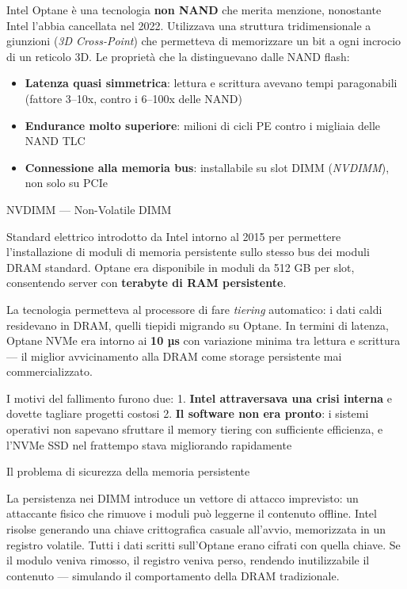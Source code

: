 \documentclass[
  italian,
  openany]{book}
\providecommand{\tightlist}{%
  \setlength{\itemsep}{0pt}\setlength{\parskip}{0pt}}
\begin{document}
Intel Optane è una tecnologia \textbf{non NAND} che merita menzione,
nonostante Intel l'abbia cancellata nel 2022. Utilizzava una struttura
tridimensionale a giunzioni (\emph{3D Cross-Point}) che permetteva di
memorizzare un bit a ogni incrocio di un reticolo 3D. Le proprietà che
la distinguevano dalle NAND flash:

\begin{itemize}
\tightlist
\item
  \textbf{Latenza quasi simmetrica}: lettura e scrittura avevano tempi
  paragonabili (fattore 3--10x, contro i 6--100x delle NAND)
\item
  \textbf{Endurance molto superiore}: milioni di cicli PE contro i
  migliaia delle NAND TLC
\item
  \textbf{Connessione alla memoria bus}: installabile su slot DIMM
  (\emph{NVDIMM}), non solo su PCIe
\end{itemize}

\begin{calloutdefinition}{NVDIMM — Non-Volatile DIMM}

Standard elettrico introdotto da Intel intorno al 2015 per permettere
l'installazione di moduli di memoria persistente sullo stesso bus dei
moduli DRAM standard. Optane era disponibile in moduli da 512 GB per
slot, consentendo server con \textbf{terabyte di RAM persistente}.

\end{calloutdefinition}

La tecnologia permetteva al processore di fare \emph{tiering}
automatico: i dati caldi residevano in DRAM, quelli tiepidi migrando su
Optane. In termini di latenza, Optane NVMe era intorno ai \textbf{10 µs}
con variazione minima tra lettura e scrittura --- il miglior
avvicinamento alla DRAM come storage persistente mai commercializzato.

I motivi del fallimento furono due: 1. \textbf{Intel attraversava una
crisi interna} e dovette tagliare progetti costosi 2. \textbf{Il
software non era pronto}: i sistemi operativi non sapevano sfruttare il
memory tiering con sufficiente efficienza, e l'NVMe SSD nel frattempo
stava migliorando rapidamente

\begin{calloutnote}{Il problema di sicurezza della memoria persistente}

La persistenza nei DIMM introduce un vettore di attacco imprevisto: un
attaccante fisico che rimuove i moduli può leggerne il contenuto
offline. Intel risolse generando una chiave crittografica casuale
all'avvio, memorizzata in un registro volatile. Tutti i dati scritti
sull'Optane erano cifrati con quella chiave. Se il modulo veniva
rimosso, il registro veniva perso, rendendo inutilizzabile il contenuto
--- simulando il comportamento della DRAM tradizionale.

\end{calloutnote}
\end{document}

